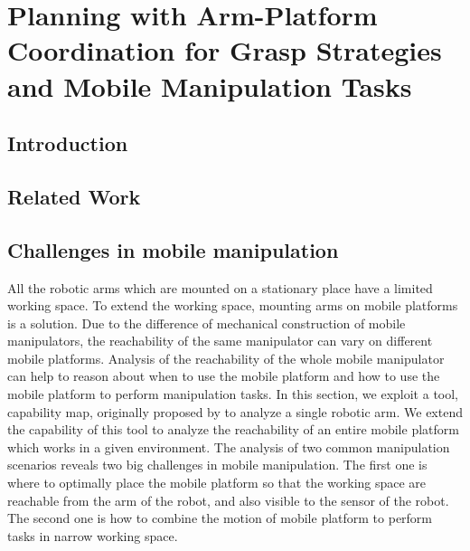 \chapter{Planning with Arm-Platform Coordination for Grasp Strategies and Mobile Manipulation Tasks}
\section{Introduction}

\section{Related Work}

\section{Challenges in mobile manipulation}
All the robotic arms which are mounted on a stationary place have a limited working space. To extend the working space, mounting arms on mobile platforms is a solution. Due to the difference of mechanical 
construction of mobile manipulators, the reachability of the same manipulator can vary on different mobile platforms. Analysis of the reachability of the whole mobile manipulator can help to reason about when to use the mobile platform and how to use the mobile platform to perform manipulation tasks. In this section, we exploit a tool, capability map, originally proposed by \todo{[]}\cite{} to analyze a single robotic arm. We extend the capability of this tool to analyze the reachability of an entire mobile platform which works in a given environment. The analysis of two common manipulation scenarios reveals two big challenges in mobile manipulation. The first one is where to optimally place the mobile platform so that the working space are reachable from the arm of the robot, and also visible to the sensor of the robot. The second one is how to combine the motion of mobile platform to perform tasks in narrow working space.
  
